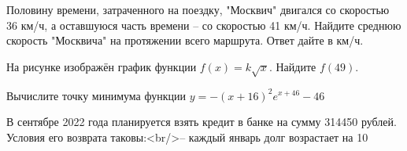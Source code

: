 \begin{taskBN}{9}
Половину времени, затраченного на поездку, "Москвич" двигался со скоростью 36 км/ч, а оставшуюся часть времени – со скоростью 41 км/ч. Найдите среднюю скорость "Москвича" на протяжении всего маршрута. Ответ дайте в км/ч.
\end{taskBN}

\begin{taskBN}{10}
На рисунке изображён график функции $f(x)=k\sqrt{x}$. Найдите $f(49)$. 
\end{taskBN}

\begin{taskBN}{11}
Вычислите точку минимума функции $y = -(x+16)^{2}e^{x+46}-46$
\end{taskBN}

\begin{taskBN}{12}
В сентябре 2022 года планируется взять кредит в банке на сумму 314450 рублей. Условия его возврата таковы:<br/>– каждый январь долг возрастает на 10%
\end{taskBN}

%



\newpage

